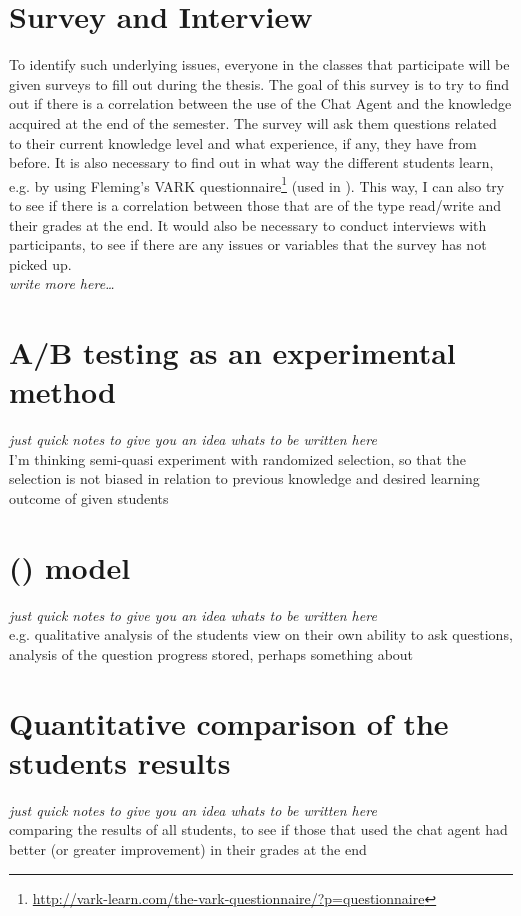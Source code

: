 \section{Survey and Interview}
\label{chapter4:survey_and_interview}
To identify such underlying issues, everyone in the classes that participate will be given surveys to fill out during the thesis. The goal of this survey is to try 
to find out if there is a correlation between the use of the Chat Agent and the knowledge acquired at the end of the semester. The survey will ask them questions 
related to their current knowledge level and what experience, if any, they have from before. It is also necessary to find out in what way the different students learn, 
e.g. by using Fleming's VARK questionnaire\footnote{\url{http://vark-learn.com/the-vark-questionnaire/?p=questionnaire}} (used in \citet[p.~152]{Kowalski2013}). This way, 
I can also try to see if there is a correlation between those that are of the type read/write and their grades at the end.
\vspace{0.5em}\newline
It would also be necessary to conduct interviews with participants, to see if there are any issues or variables that the survey has not picked up. \\
\emph{write more here\ldots}

\section{A/B testing as an experimental method}
\label{chapter4:ab_testing_experimental}
\emph{just quick notes to give you an idea whats to be written here} \\
I'm thinking semi-quasi experiment with randomized selection, so that the selection is not biased in relation to previous knowledge and desired learning outcome of 
given students

\section{ () model}
\label{chapter4:qa_model}
\emph{just quick notes to give you an idea whats to be written here} \\
e.g. qualitative analysis of the students view on their own ability to ask questions, analysis of the question progress stored, perhaps something about 

\section{Quantitative comparison of the students results}
\label{chapter4:quantitative_comparison}
\emph{just quick notes to give you an idea whats to be written here} \\
comparing the results of all students, to see if those that used the chat agent had better (or greater improvement) in their grades at the end

